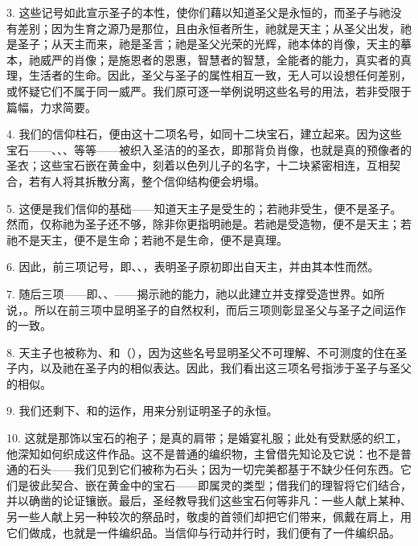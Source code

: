 3. 这些记号如此宣示圣子的本性，使你们藉以知道圣父是永恒的，而圣子与祂没有差别；因为生育之源乃是那位，且由永恒者所生，祂就是天主；从圣父出发，祂是圣子；从天主而来，祂是圣言；祂是圣父光荣的光辉，祂本体的肖像，天主的摹本，祂威严的肖像；是施恩者的恩惠，智慧者的智慧，全能者的能力，真实者的真理，生活者的生命。因此，圣父与圣子的属性相互一致，无人可以设想任何差别，或怀疑它们不属于同一威严。我们原可逐一举例说明这些名号的用法，若非受限于篇幅，力求简要。\par

4. 我们的信仰柱石，便由这十二项名号，如同十二块宝石，建立起来。因为这些宝石——、、、等等——被织入圣洁的的圣衣，即那背负肖像，也就是真的预像者的圣衣；这些宝石嵌在黄金中，刻着以色列儿子的名字，十二块紧密相连，互相契合，若有人将其拆散分离，整个信仰结构便会坍塌。\par

5. 这便是我们信仰的基础——知道天主子是受生的；若祂非受生，便不是圣子。然而，仅称祂为圣子还不够，除非你更指明祂是。若祂是受造物，便不是天主；若祂不是天主，便不是生命；若祂不是生命，便不是真理。\par

6. 因此，前三项记号，即、、，表明圣子原初即出自天主，并由其本性而然。\par

7. 随后三项——即、、——揭示祂的能力，祂以此建立并支撑受造世界。如所说，。所以在前三项中显明圣子的自然权利，而后三项则彰显圣父与圣子之间运作的一致。\par

8. 天主子也被称为、和（），因为这些名号显明圣父不可理解、不可测度的住在圣子内，以及祂在圣子内的相似表达。因此，我们看出这三项名号指涉于圣子与圣父的相似。\par

9. 我们还剩下、和的运作，用来分别证明圣子的永恒。\par

10. 这就是那饰以宝石的袍子；是真的肩带；是婚宴礼服；此处有受默感的织工，他深知如何织成这件作品。这不是普通的编织物，主曾借先知论及它说：也不是普通的石头——我们见到它们被称为石头；因为一切完美都基于不缺少任何东西。它们是彼此契合、嵌在黄金中的宝石——即属灵的类型；借我们的理智将它们结合，并以确凿的论证镶嵌。最后，圣经教导我们这些宝石何等非凡：一些人献上某种、另一些人献上另一种较次的祭品时，敬虔的首领们却把它们带来，佩戴在肩上，用它们做成，也就是一件编织品。当信仰与行动并行时，我们便有了一件编织品。\par


